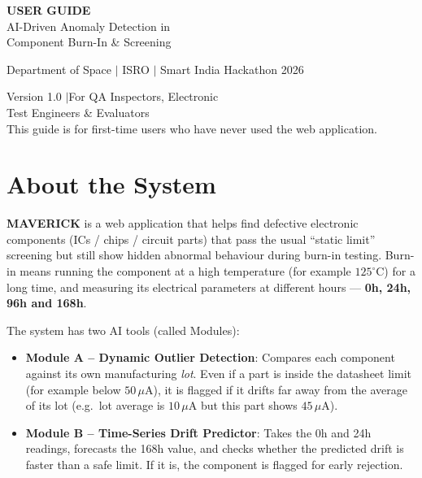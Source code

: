\documentclass[11pt,a4paper]{article}
\begin{document}
\thispagestyle{empty}
\vspace*{6cm}
\begin{center}
  {\color{isroblue} }

  \vspace{2.5cm}
  {\Huge\bfseries\color{isrodarkblue} USER GUIDE}\\[8pt]
  {\large\color{black!70} AI-Driven Anomaly Detection in}\\[4pt]
  {\large\color{black!70} Component Burn-In \& Screening}

  \vspace{2cm}
  {\small\color{orange!70!black} Department of Space $|$ ISRO $|$ Smart India Hackathon 2026}

  \vspace{4cm}
  {\footnotesize\color{gray} Version 1.0 \quad$|$\quad For QA Inspectors, Electronic\\[2pt]
   Test Engineers \& Evaluators}\\[8pt]
  {\footnotesize\color{gray} This guide is for first-time users who have never used the web application.}
\end{center}
\newpage

\section{About the System}
\textbf{MAVERICK} is a web application that helps find defective electronic components (ICs / chips /
circuit parts) that pass the usual ``static limit'' screening but still show hidden abnormal behaviour
during burn-in testing. Burn-in means running the component at a high temperature (for example
$125^{\circ}$C) for a long time, and measuring its electrical parameters at different hours ---
\textbf{0h, 24h, 96h and 168h}.

The system has two AI tools (called Modules):
\begin{itemize}
  \item \textbf{Module A -- Dynamic Outlier Detection}: Compares each component against its own
        manufacturing \textit{lot}. Even if a part is inside the datasheet limit (for example below
        $50\,\mu$A), it is flagged if it drifts far away from the average of its lot
        (e.g.\ lot average is $10\,\mu$A but this part shows $45\,\mu$A).
  \item \textbf{Module B -- Time-Series Drift Predictor}: Takes the 0h and 24h readings, forecasts the
        168h value, and checks whether the predicted drift is faster than a safe limit. If it is, the
        component is flagged for early rejection.
\end{itemize}
\end{document}
